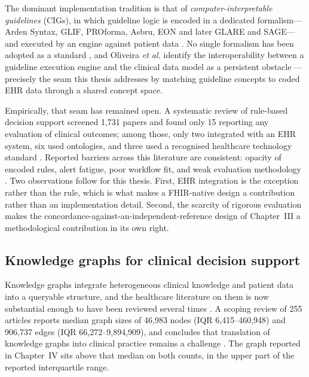 The dominant implementation tradition is that of \emph{computer-in\-ter\-pret\-able guidelines}
(CIGs), in which guideline logic is encoded in a dedicated formalism---Arden Syntax,
GLIF, PROforma, Asbru, EON and later GLARE and SAGE---and executed by an engine against
patient data \cite{declercq2004,declercq2008,oliveira2014}. No single formalism has been
adopted as a standard \cite{declercq2008}, and Oliveira \textit{et al.}
identify the interoperability between a guideline execution engine and the clinical data
model as a persistent obstacle \cite{oliveira2014}---precisely the seam
this thesis addresses by matching guideline concepts to coded EHR data through a shared
concept space.

Empirically, that seam has remained open. A systematic review of rule-based decision
support screened 1{,}731 papers and found only 15 reporting
any evaluation of clinical outcomes; among those, only two integrated with
an EHR system, six used ontologies, and three used a recognised healthcare technology
standard \cite{papadopoulos2022}. Reported barriers across this literature
are consistent: opacity of encoded rules, alert fatigue, poor workflow fit, and weak
evaluation methodology \cite{papadopoulos2022,bosetti2025,silva2022}.
Two observations follow for this thesis. First, EHR integration is the exception rather
than the rule, which is what makes a FHIR-native design a contribution rather than an
implementation detail. Second, the scarcity of rigorous evaluation makes the
concordance-against-an-independent-reference design of Chapter~III a methodological
contribution in its own right.

\subsection{Knowledge graphs for clinical decision support}
\label{sec:rw-kg}
Knowledge graphs integrate heterogeneous clinical knowledge and patient data into a
queryable structure, and the healthcare literature on them is now substantial enough to
have been reviewed several times \cite{abusalih2023,cui_h2023,budhdeo2023}. A scoping
review of 255 articles reports median graph sizes of
46{,}983 nodes (IQR 6{,}415--460{,}948) and
906{,}737 edges (IQR 66{,}272--9{,}894{,}909), and concludes
that translation of knowledge graphs into clinical practice remains a
challenge \cite{budhdeo2023}. The graph reported in Chapter~IV sits above that median on
both counts, in the upper part of the reported interquartile range.


